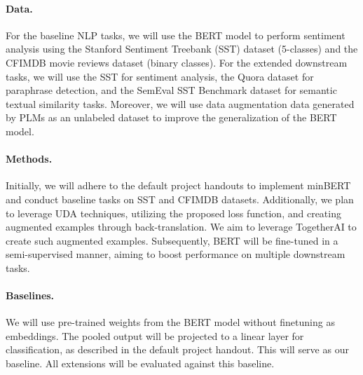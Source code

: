 \documentclass{article}
\begin{document}
\paragraph{Data.}
For the baseline NLP tasks, we will use the BERT model to perform sentiment analysis 
using the Stanford Sentiment Treebank (SST) dataset (5-classes) and the CFIMDB movie 
reviews dataset (binary classes). For the extended downstream tasks, we will use the 
SST for sentiment analysis, the Quora dataset for paraphrase detection, and the SemEval 
SST Benchmark dataset for semantic textual similarity tasks. Moreover, we will use 
data augmentation data generated by PLMs as an unlabeled dataset to improve the
generalization of the BERT model.


\paragraph{Methods.}
Initially, we will adhere to the default project handouts to implement minBERT and 
conduct baseline tasks on SST and CFIMDB datasets. Additionally, we plan to leverage 
UDA techniques, utilizing the proposed loss function, and creating augmented examples 
through back-translation. We aim to leverage TogetherAI to create such augmented examples. 
Subsequently, BERT will be fine-tuned in a semi-supervised manner, aiming to boost 
performance on multiple downstream tasks.

\paragraph{Baselines.}
We will use pre-trained weights from the BERT model without finetuning as embeddings. 
The pooled output will be projected to a linear layer for classification, as described 
in the default project handout. This will serve as our baseline. All extensions will 
be evaluated against this baseline.
\end{document}
